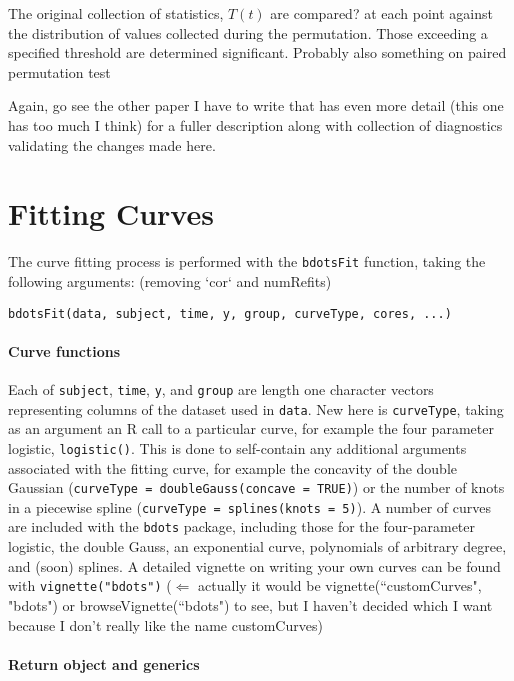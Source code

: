 \documentclass{article}
\begin{document}
The original collection of statistics, $T(t)$ are compared? at each point against the distribution of values collected during the permutation. Those exceeding a specified threshold are determined significant. Probably also something on paired permutation test

Again, go see the other paper I have to write that has even more detail (this one has too much I think) for a fuller description along with collection of diagnostics validating the changes made here.

\section{Fitting Curves}

The curve fitting process is performed with the \texttt{bdotsFit} function, taking the following arguments: (removing `cor` and numRefits)

\begin{center}
\begin{verbatim}
bdotsFit(data, subject, time, y, group, curveType, cores, ...)
\end{verbatim}
\end{center}

\paragraph{Curve functions} Each of \texttt{subject}, \texttt{time}, \texttt{y}, and \texttt{group} are length one character vectors representing columns of the dataset used in \texttt{data}. New here is \texttt{curveType}, taking as an argument an R call to a particular curve, for example the four parameter logistic, \texttt{logistic()}. This is done to self-contain any additional arguments associated with the fitting curve, for example the concavity of the double Gaussian (\texttt{curveType = doubleGauss(concave = TRUE)}) or the number of knots in a piecewise spline (\texttt{curveType = splines(knots = 5)}). A number of curves are included with the \texttt{bdots} package, including those for the four-parameter logistic, the double Gauss, an exponential curve, polynomials of arbitrary degree, and (soon) splines. A detailed vignette on writing your own curves can be found with \texttt{vignette("bdots")} ($\Leftarrow$ actually it would be vignette(``customCurves", "bdots") or browseVignette(``bdots") to see, but I haven't decided which I want because I don't really like the name customCurves)


\paragraph{Return object and generics}
\end{document}
